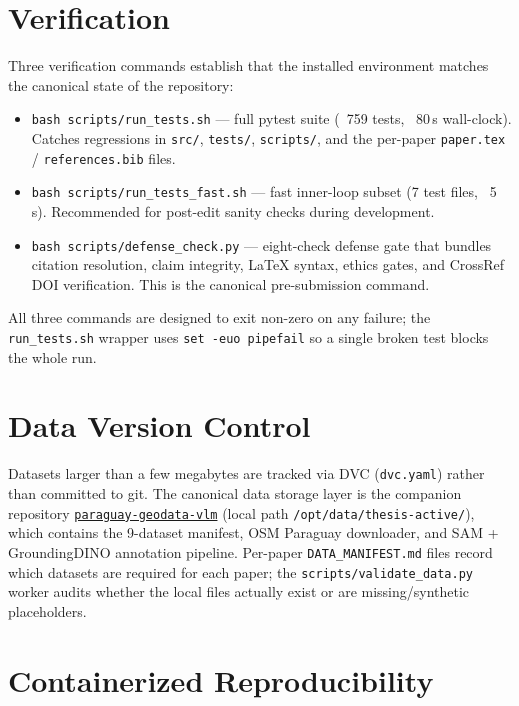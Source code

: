 \section{Verification}

Three verification commands establish that the installed environment
matches the canonical state of the repository:

\begin{itemize}
    \item \texttt{bash scripts/run\_tests.sh} — full pytest suite
      (~759 tests, ~80\,s wall-clock). Catches regressions in
      \texttt{src/}, \texttt{tests/}, \texttt{scripts/}, and the
      per-paper \texttt{paper.tex} / \texttt{references.bib} files.
    \item \texttt{bash scripts/run\_tests\_fast.sh} — fast inner-loop
      subset (7 test files, ~5\,s). Recommended for post-edit
      sanity checks during development.
    \item \texttt{bash scripts/defense\_check.py} — eight-check defense
      gate that bundles citation resolution, claim integrity,
      LaTeX syntax, ethics gates, and CrossRef DOI verification.
      This is the canonical pre-submission command.
\end{itemize}

All three commands are designed to exit non-zero on any failure; the
\texttt{run\_tests.sh} wrapper uses \texttt{set -euo pipefail} so a
single broken test blocks the whole run.

\section{Data Version Control}

Datasets larger than a few megabytes are tracked via DVC
(\texttt{dvc.yaml}) rather than committed to git. The canonical data
storage layer is the companion repository
\href{https://github.com/IvanWeissVanDerPol/paraguay-geodata-vlm}{\texttt{paraguay-geodata-vlm}}
(local path \texttt{/opt/data/thesis-active/}), which contains the
9-dataset manifest, OSM Paraguay downloader, and SAM +
GroundingDINO annotation pipeline. Per-paper \texttt{DATA\_MANIFEST.md}
files record which datasets are required for each paper; the
\texttt{scripts/validate\_data.py} worker audits whether the local
files actually exist or are missing/synthetic placeholders.

\section{Containerized Reproducibility}

